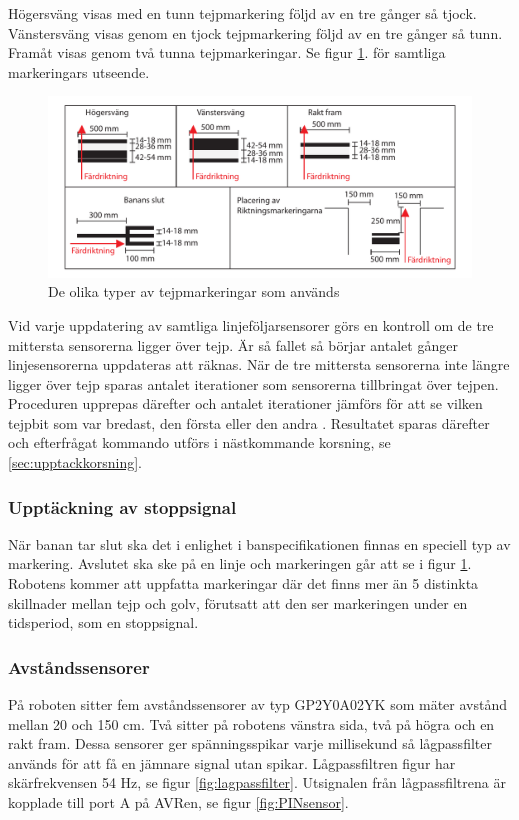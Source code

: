 Högersväng visas med en tunn tejpmarkering följd av en tre gånger så tjock.
Vänstersväng visas genom en tjock tejpmarkering följd av en tre gånger så tunn.
Framåt visas genom två tunna tejpmarkeringar. Se figur \ref{fig:tejpmarkeringar}.
för samtliga markeringars utseende.

\begin{figure}[H]
  \centering
 \includegraphics[angle=0,scale=0.5]{bilder/tejpmarkeringar.pdf}
  \caption{De olika typer av tejpmarkeringar som används}
  \label{fig:tejpmarkeringar}
\end{figure}


Vid varje uppdatering av samtliga linjeföljarsensorer görs en kontroll om de 
tre mittersta sensorerna ligger över tejp. Är så fallet så börjar antalet 
gånger linjesensorerna uppdateras att räknas. När de tre mittersta sensorerna 
inte längre ligger över tejp sparas antalet iterationer som sensorerna 
tillbringat över tejpen. Proceduren upprepas därefter och antalet iterationer 
jämförs för att se vilken tejpbit som var bredast, den första eller den andra
. Resultatet sparas därefter och efterfrågat kommando utförs i nästkommande 
korsning, se \ref{sec:upptackkorsning}.

\subsubsection{Upptäckning av stoppsignal}
När banan tar slut ska det i enlighet i banspecifikationen finnas en speciell typ av 
markering. Avslutet ska ske på en linje och markeringen går att se i figur \ref{fig:tejpmarkeringar}.
Robotens kommer att uppfatta markeringar där det finns mer än 5 distinkta skillnader mellan tejp och golv, förutsatt att den ser markeringen under en tidsperiod, som en stoppsignal. 


\subsubsection{Avståndssensorer}
På roboten sitter fem avståndssensorer av typ GP2Y0A02YK som mäter avstånd
mellan 20 och 150 cm. Två sitter på robotens vänstra sida, två på högra och en
rakt fram. Dessa sensorer ger spänningsspikar varje millisekund så lågpassfilter
används för att få en jämnare signal utan spikar. Lågpassfiltren figur
har skärfrekvensen 54 Hz, se figur \ref{fig:lagpassfilter}. Utsignalen från
lågpassfiltrena är kopplade till port A på AVRen, se figur \ref{fig:PINsensor}.

